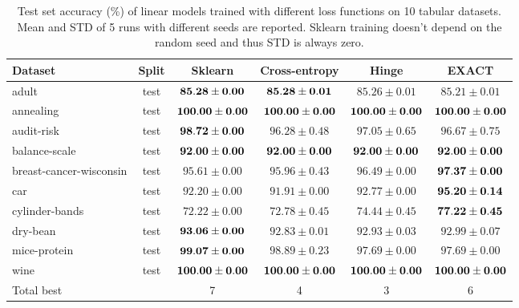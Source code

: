 \documentclass[nohyperref]{article}
\theoremstyle{plain}
\theoremstyle{definition}
\theoremstyle{remark}
\begin{document}
\begin{table*}[t]
\centering
\begin{tabular}{lc|cccc}
Dataset & Split & Sklearn & Cross-entropy & Hinge & EXACT \\
\hline

adult                   & test & $\bf 85.28 \pm 0.00$ & $\bf 85.28 \pm 0.01$ & $85.26 \pm 0.01$ & $85.21 \pm 0.01$ \\
annealing               & test & $\bf 100.00 \pm 0.00$ & $\bf 100.00 \pm 0.00$ & $\bf 100.00 \pm 0.00$ & $\bf 100.00 \pm 0.00$ \\
audit-risk              & test & $\bf 98.72 \pm 0.00$ & $96.28 \pm 0.48$ & $97.05 \pm 0.65$ & $96.67 \pm 0.75$ \\
balance-scale           & test & $\bf 92.00 \pm 0.00$ & $\bf 92.00 \pm 0.00$ & $\bf 92.00 \pm 0.00$ & $\bf 92.00 \pm 0.00$ \\
breast-cancer-wisconsin & test & $95.61 \pm 0.00$ & $95.96 \pm 0.43$ & $96.49 \pm 0.00$ & $\bf 97.37 \pm 0.00$ \\
car                     & test & $92.20 \pm 0.00$ & $91.91 \pm 0.00$ & $92.77 \pm 0.00$ & $\bf 95.20 \pm 0.14$ \\
cylinder-bands          & test & $72.22 \pm 0.00$ & $72.78 \pm 0.45$ & $74.44 \pm 0.45$ & $\bf 77.22 \pm 0.45$ \\
dry-bean                & test & $\bf 93.06 \pm 0.00$ & $92.83 \pm 0.01$ & $92.93 \pm 0.03$ & $92.99 \pm 0.07$ \\
mice-protein            & test & $\bf 99.07 \pm 0.00$ & $98.89 \pm 0.23$ & $97.69 \pm 0.00$ & $97.69 \pm 0.00$ \\
wine                    & test & $\bf 100.00 \pm 0.00$ & $\bf 100.00 \pm 0.00$ & $\bf 100.00 \pm 0.00$ & $\bf 100.00 \pm 0.00$ \\
\hline
Total best & & 7 & 4 & 3 & 6 \\




\end{tabular}
\vskip 0.2in
\caption{Test set accuracy (\%) of linear models trained with different loss functions on 10 tabular datasets. Mean and STD of 5 runs with different seeds are reported. Sklearn training doesn't depend on the random seed and thus STD is always zero.}
\label{tab:uci-test}
\end{table*}
\end{document}
